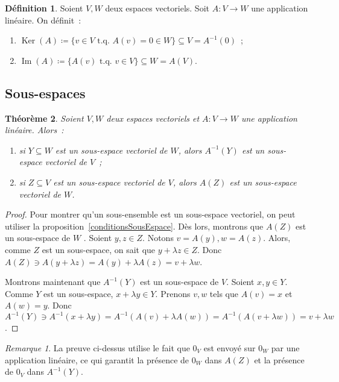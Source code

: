 \documentclass{article}
\DeclareMathOperator{\Ker}{Ker}
\DeclareMathOperator{\Imf}{Im}
\newcommand{\tq}{\textrm{ t.q. }}
\newtheorem{thm}{Théorème}[section]
\theoremstyle{definition}
\newtheorem{déf}[thm]{Définition}
\theoremstyle{remark}
\newtheorem*{rmq}{Remarque}
\begin{document}
		\begin{déf} Soient $V, W$ deux espaces vectoriels. Soit $A : V \to W$ une application linéaire. On définit~:
		\begin{enumerate}
			\item $\Ker(A) \coloneqq \{v \in V \tq A(v) = 0 \in W\} \subseteq V = A^{-1}(0)$~;
			\item $\Imf(A) \coloneqq \{A(v) \tq v \in V\} \subseteq W = A(V)$.
		\end{enumerate}
		\end{déf}

	\subsection{Sous-espaces}
		\begin{thm}\label{sousEspacesApplicationLinéaire} Soient $V, W$ deux espaces vectoriels et $A : V \to W$ une application linéaire. Alors~:
		\begin{enumerate}
			\item si $Y \subseteq W$ est un sous-espace vectoriel de $W$, alors $A^{-1}(Y)$ est un sous-espace vectoriel de $V$~;
			\item si $Z \subseteq V$ est un sous-espace vectoriel de $V$, alors $A(Z)$ est un sous-espace vectoriel de $W$.
		\end{enumerate}
		\end{thm}

		\begin{proof} Pour montrer qu'un sous-ensemble est un sous-espace vectoriel, on peut utiliser la proposition~\ref{conditionsSousEspace}. Dès lors, montrons que
		$A(Z)$ est un sous-espace de $W$ . Soient $y, z \in Z$. Notons $v = A(y), w = A(z)$. Alors, comme $Z$ est un sous-espace, on sait que $y + \lambda z \in Z$. Donc
		$A(Z) \ni A(y + \lambda z) = A(y) + \lambda A(z) = v + \lambda w$.

		Montrons maintenant que $A^{-1}(Y)$ est un sous-espace de $V$. Soient $x, y \in Y$. Comme $Y$ est un sous-espace, $x + \lambda y \in Y$. Prenons $v, w$ tels que
		$A(v) = x$ et $A(w) = y$. Donc $A^{-1}(Y) \ni A^{-1}(x + \lambda y) = A^{-1}(A(v) + \lambda A(w)) = A^{-1}(A(v + \lambda w)) = v+\lambda w$. \end{proof}

		\begin{rmq} La preuve ci-dessus utilise le fait que $0_V$ est envoyé sur $0_W$ par une application linéaire, ce qui garantit la présence de $0_W$ dans $A(Z)$
		et la présence de $0_V$ dans $A^{-1}(Y)$. \end{rmq}
\end{document}
